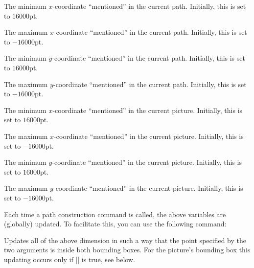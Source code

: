 \begin{textoken}{\pgf@pathminx}
  The minimum $x$-coordinate ``mentioned'' in the current
  path. Initially, this is set to $16000$pt.
\end{textoken}

\begin{textoken}{\pgf@pathmaxx}
  The maximum $x$-coordinate ``mentioned'' in the current
  path. Initially, this is set to $-16000$pt.
\end{textoken}

\begin{textoken}{\pgf@pathminy}
  The minimum $y$-coordinate ``mentioned'' in the current
  path. Initially, this is set to $16000$pt.
\end{textoken}

\begin{textoken}{\pgf@pathmaxy}
  The maximum $y$-coordinate ``mentioned'' in the current
  path. Initially, this is set to $-16000$pt.
\end{textoken}

\begin{textoken}{\pgf@picminx}
  The minimum $x$-coordinate ``mentioned'' in the current
  picture. Initially, this is set to $16000$pt.
\end{textoken}

\begin{textoken}{\pgf@picmaxx}
  The maximum $x$-coordinate ``mentioned'' in the current
  picture. Initially, this is set to $-16000$pt.
\end{textoken}

\begin{textoken}{\pgf@picminy}
  The minimum $y$-coordinate ``mentioned'' in the current
  picture. Initially, this is set to $16000$pt.
\end{textoken}

\begin{textoken}{\pgf@picmaxy}
  The maximum $y$-coordinate ``mentioned'' in the current
  picture. Initially, this is set to $-16000$pt.
\end{textoken}


Each time a path construction command is called, the above variables
are (globally) updated. To facilitate this, you can use the following
command:

\begin{command}{\pgf@protocolsizes{}}
  Updates all of the above dimension in such a way that the point
  specified by the two arguments is inside both bounding boxes. For
  the picture's bounding box this updating occurs only if
  |\ifpgf@relevantforpicturesize| is true, see below.
\end{command}

